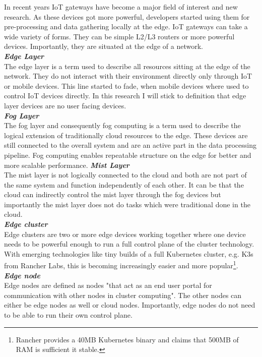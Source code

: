 In recent years IoT gateways have become a major field of interest and new research. As these devices got more powerful, developers started using them for pre-processing and data gathering locally at the edge.
IoT gateways can take a wide variety of forms. They can be simple L2/L3 routers or more powerful devices. Importantly, they are situated at the edge of a network.\\[5mm]
\textbf{\textit{Edge Layer}}\\
The edge layer is a term used to describe all resources sitting at the edge of the network. They do not interact with their environment directly only through IoT or mobile devices. This line started to fade, when mobile devices where used to control IoT devices directly. In this research I will stick to definition that edge layer devices are no user facing devices.\\[5mm]
\textbf{\textit{Fog Layer}}\\
The fog layer and consequently fog computing is a term used to describe the logical extension of traditionally cloud resources to the edge. These devices are still connected to the overall system and are an active part in the data processing pipeline. Fog computing enables repeatable structure on the edge for better and more scalable performance.
\textbf{\textit{Mist Layer}}\\
The mist layer is not logically connected to the cloud and both are not part of the same system and function independently of each other. It can be that the cloud can indirectly control the mist layer through the fog devices but importantly the mist layer does not do tasks which were traditional done in the cloud. \\[5mm]
\textbf{\textit{Edge cluster}}\\
Edge clusters are two or more edge devices working together where one device needs to be powerful enough to run a full control plane of the cluster technology. With emerging technologies like tiny builds of a full Kubernetes cluster, e.g. K3s from Rancher Labs\cite{k3sLight14:online}, this is becoming increasingly easier and more popular\footnote{Rancher provides a 40MB Kubernetes binary and claims that 500MB of RAM is sufficient 
it stable.}.\\[5mm]
\textbf{\textit{Edge node}}\\
Edge nodes are defined as nodes "that act as an end user portal for communication with other
nodes in cluster computing"\cite{Whatised17:edgeNodeDef}. The other nodes can either be edge nodes as well or cloud nodes. Importantly, edge nodes do not need to be able to run their own control plane.
